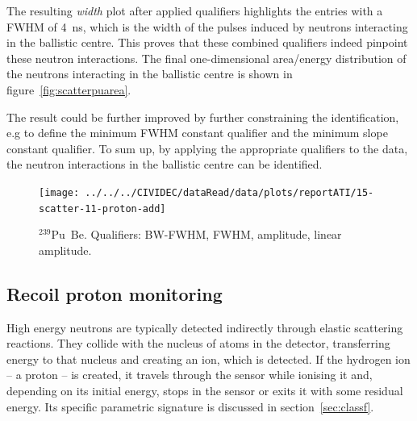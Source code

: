 The resulting \emph{width} plot after applied qualifiers highlights the entries with a FWHM of 4~ns, which is the width of the pulses induced by neutrons interacting in the ballistic centre. This proves that these combined qualifiers indeed pinpoint these neutron interactions. The final one-dimensional area/energy distribution of the neutrons interacting in the ballistic centre is shown in figure~\ref{fig:scatterpuarea}. 

The result could be further improved by further constraining the identification, e.g to define the minimum FWHM constant qualifier and the minimum slope constant qualifier. To sum up, by applying the appropriate qualifiers to the data, the neutron interactions in the ballistic centre can be identified.






\clearpage
\begin{figure}[]
\centering
\texttt{[image: ../../../CIVIDEC/dataRead/data/plots/reportATI/15-scatter-11-proton-add]}
\caption{$^{239}$Pu~Be. Qualifiers: BW-FWHM, FWHM, amplitude, linear amplitude.}
\label{fig:scatterpu}
\end{figure}

\clearpage
\subsection{Recoil proton monitoring}
High energy neutrons are typically detected indirectly through elastic scattering reactions. They collide with the nucleus of atoms in the detector, transferring energy to that nucleus and creating an ion, which is detected. If the hydrogen ion -- a proton -- is created, it travels through the sensor while ionising it and, depending on its initial energy, stops in the sensor or exits it with some residual energy. Its specific parametric signature is discussed in section~\ref{sec:classf}.


